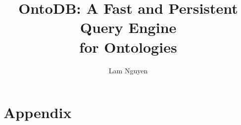 \documentclass[sigconf, nonacm]{acmart}
\newif\iffull
\begin{document}
\iffull
\title{OntoDB: A Fast and Persistent Query Engine\\for Ontologies (Extended Version)}
\else
\title{OntoDB: A Fast and Persistent Query Engine\\for Ontologies}
\fi

\author{Lam Nguyen}




\maketitle

\vldbtopmatter

\iffull












\else











\fi




\clearpage
\appendix
\section*{Appendix}

\end{document}
